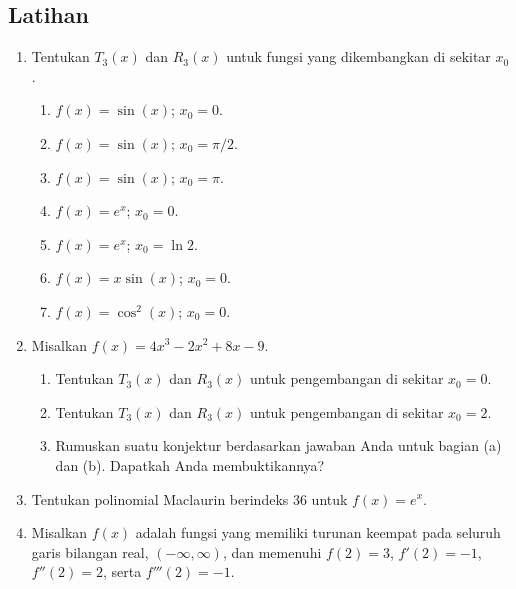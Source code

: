 \noindent\startexercises

\subsection{Latihan}
\begin{enumerate}
\item Tentukan $T_{3}(x)$ dan $R_{3}(x)$ untuk fungsi yang dikembangkan
di sekitar $x_{0}$.

\begin{enumerate}
\item \label{exc:taylor1}$f(x)=\sin(x)$; $x_{0}=0$. \hasasolution 
\item $f(x)=\sin(x)$; $x_{0}=\pi/2$.
\item \label{exc:taylor2}$f(x)=\sin(x)$; $x_{0}=\pi$. \hasasolution 
\item $f(x)=e^{x}$; $x_{0}=0$.
\item $f(x)=e^{x}$; $x_{0}=\ln2$.
\item \label{exc:taylor3}$f(x)=x\sin(x)$; $x_{0}=0$. \hasananswer 
\item $f(x)=\cos^{2}(x)$; $x_{0}=0$.
\end{enumerate}
\item Misalkan $f(x)=4x^{3}-2x^{2}+8x-9$.

\begin{enumerate}
\item Tentukan $T_{3}(x)$ dan $R_{3}(x)$ untuk pengembangan di sekitar
$x_{0}=0$.
\item Tentukan $T_{3}(x)$ dan $R_{3}(x)$ untuk pengembangan di sekitar
$x_{0}=2$.
\item Rumuskan suatu konjektur berdasarkan jawaban Anda untuk bagian (a)
dan (b). Dapatkah Anda membuktikannya?
\end{enumerate}
\item Tentukan polinomial Maclaurin berindeks $36$ untuk $f(x)=e^{x}$.
\item Misalkan $f(x)$ adalah fungsi yang memiliki turunan keempat pada
seluruh garis bilangan real, $(-\infty,\infty)$, dan memenuhi $f(2)=3$,
$f'(2)=-1$, $f''(2)=2$, serta $f'''(2)=-1$.


\end{enumerate}
